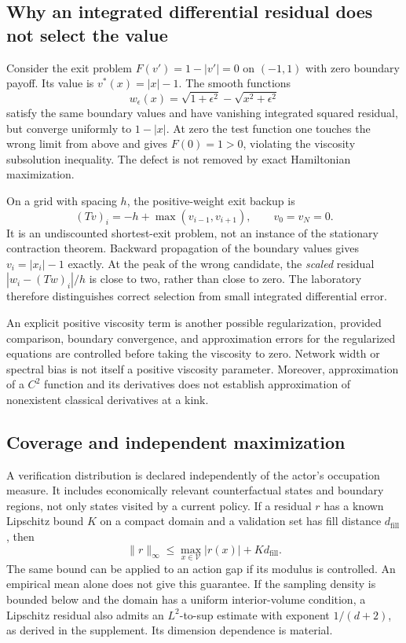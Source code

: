 \documentclass[ecta,nameyear,draft]{econsocart}
\theoremstyle{definition}
\theoremstyle{remark}
\begin{document}
\subsection{Why an integrated differential residual does not select the value}
Consider the exit problem $F(v')=1-|v'|=0$ on $(-1,1)$ with zero boundary payoff. Its value is $v^*(x)=|x|-1$. The smooth functions
\[
 w_\epsilon(x)=\sqrt{1+\epsilon^2}-\sqrt{x^2+\epsilon^2}
\]
satisfy the same boundary values and have vanishing integrated squared residual, but converge uniformly to $1-|x|$. At zero the test function one touches the wrong limit from above and gives $F(0)=1>0$, violating the viscosity subsolution inequality. The defect is not removed by exact Hamiltonian maximization.

On a grid with spacing $h$, the positive-weight exit backup is
\begin{equation}\label{eq:exit}
 (Tv)_i=-h+\max(v_{i-1},v_{i+1}),\qquad v_0=v_N=0.
\end{equation}
It is an undiscounted shortest-exit problem, not an instance of the stationary contraction theorem. Backward propagation of the boundary values gives $v_i=|x_i|-1$ exactly. At the peak of the wrong candidate, the \emph{scaled} residual $|w_i-(Tw)_i|/h$ is close to two, rather than close to zero. The laboratory therefore distinguishes correct selection from small integrated differential error.

An explicit positive viscosity term is another possible regularization, provided comparison, boundary convergence, and approximation errors for the regularized equations are controlled before taking the viscosity to zero. Network width or spectral bias is not itself a positive viscosity parameter. Moreover, approximation of a $C^2$ function and its derivatives does not establish approximation of nonexistent classical derivatives at a kink.

\subsection{Coverage and independent maximization}\label{sec:coverage}
A verification distribution is declared independently of the actor's occupation measure. It includes economically relevant counterfactual states and boundary regions, not only states visited by a current policy. If a residual $r$ has a known Lipschitz bound $K$ on a compact domain and a validation set has fill distance $d_\mathrm{fill}$, then
\begin{equation}\label{eq:cover}
 \|r\|_\infty\leq\max_{x\in\mathcal V}|r(x)|+K d_\mathrm{fill}.
\end{equation}
The same bound can be applied to an action gap if its modulus is controlled. An empirical mean alone does not give this guarantee. If the sampling density is bounded below and the domain has a uniform interior-volume condition, a Lipschitz residual also admits an $L^2$-to-sup estimate with exponent $1/(d+2)$, as derived in the supplement. Its dimension dependence is material.
\end{document}
